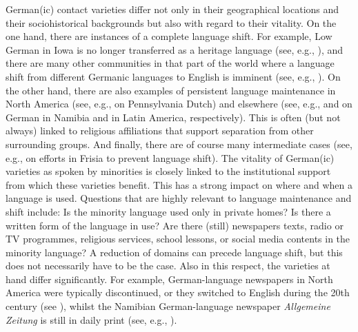 \documentclass[output=paper]{langsci/langscibook}
\begin{document}
German(ic) contact varieties differ not only in their geographical locations and their sociohistorical backgrounds but also with regard to their vitality. On the one hand, there are instances of a complete language shift. For example, Low German in Iowa is no longer transferred as a heritage language (see, e.g., ), and there are many other communities in that part of the world where a language shift from different Germanic languages to English is imminent (see, e.g., \citealt{page_moribund_2015}). On the other hand, there are also examples of persistent language maintenance in North America (see, e.g., \citealt{Louden2016} on Pennsylvania Dutch) and elsewhere (see, e.g., \citealt{shah_german_2018} and \citealt{rosenberg_lateinamerika_2018} on German in Namibia and in Latin America, respectively). This is often (but not always) linked to religious affiliations that support separation from other surrounding groups. And finally, there are of course many intermediate cases (see, e.g.,  on efforts in Frisia to prevent language shift). The vitality of German(ic) varieties as spoken by minorities is closely linked to the institutional support from which these varieties benefit. This has a strong impact on where and when a language is used. Questions that are highly relevant to language maintenance and shift include: Is the minority language used only in private homes? Is there a written form of the language in use? Are there (still) newspapers texts, radio or TV programmes, religious services, school lessons, or social media contents in the minority language? A reduction of domains can precede language shift, but this does not necessarily have to be the case. Also in this respect, the varieties at hand differ significantly. For example, German-language newspapers in North America were typically discontinued, or they switched to English during the 20th century (see ), whilst the Namibian German-language newspaper \textit{Allgemeine Zeitung} is still in daily print (see, e.g., \citealt{shah_german_2018}).
\end{document}
